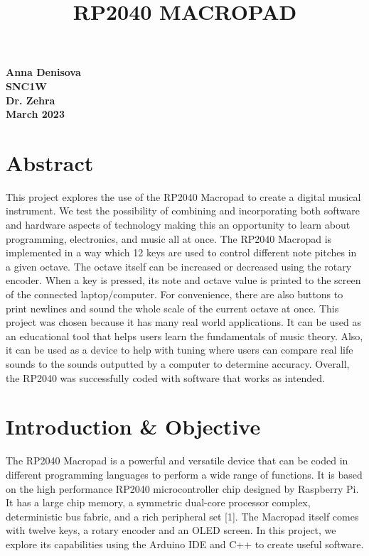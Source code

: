 \documentclass{article}
\begin{document}
\title{RP2040 MACROPAD}
\author{}
\date{}
\maketitle

\begin{center}
    \textbf{
    Anna Denisova\\
    SNC1W\\
    Dr. Zehra\\
    March 2023\\
    }
\end{center}

\tableofcontents

\newpage

\section{Abstract}

\hspace{1cm} This project explores the use of the RP2040 Macropad to create a digital musical instrument. We test the possibility of combining and incorporating both software and hardware aspects of technology making this an opportunity to learn about programming, electronics, and music all at once. The RP2040 Macropad is implemented in a way which 12 keys are used to control different note pitches in a given octave. The octave itself can be increased or decreased using the rotary encoder. When a key is pressed, its note and octave value is printed to the screen of the connected laptop/computer. For convenience, there are also buttons to print newlines and sound the whole scale of the current octave at once. This project was chosen because it has many real world applications. It can be used as an educational tool that helps users learn the fundamentals of music theory. Also, it can be used as a device to help with tuning where users can compare real life sounds to the sounds outputted by a computer to determine accuracy. Overall, the RP2040 was successfully coded with software that works as intended.

\section{Introduction \& Objective}

\hspace{1cm} The RP2040 Macropad is a powerful and versatile device that can be coded in different programming languages to perform a wide range of functions. It is based on the high performance RP2040 microcontroller chip designed by Raspberry Pi. It has a large chip memory, a symmetric dual-core processor complex, deterministic bus fabric, and a rich peripheral set [1]. The Macropad itself comes with twelve keys, a rotary encoder and an OLED screen. In this project, we explore its capabilities using the Arduino IDE and C++ to create useful software. 
\end{document}

